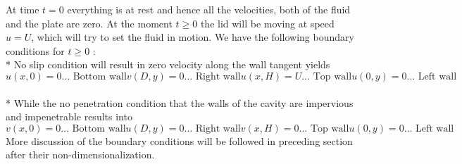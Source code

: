 \documentclass{article}
\begin{document}
At time $t=0$ everything is at rest and hence all the velocities, both of the fluid and the plate are zero. At the moment $t \geq0$ the lid will be moving at speed $u=U$, which will try to set the fluid in motion. We have the following boundary conditions for $t\geq0$ :
\\*
No slip condition will result in zero velocity along the wall tangent yields
\begin{subequations}
\begin{equation}
u(x,0)=0  \dots \text{ Bottom wall}
\end{equation}
\begin{equation}
v(D,y)=0 \dots \text{ Right wall}
\end{equation}
\begin{equation}
u(x,H)=U \dots \text{ Top wall}
\end{equation}
\begin{equation}
u(0,y)=0 \dots \text{ Left wall}
\end{equation}
\end{subequations}
\\*
While the no penetration condition that the walls of the cavity are impervious and impenetrable results into
\begin{subequations}
\begin{equation} 
v(x,0)=0 \dots \text{ Bottom wall}
\end{equation}
\begin{equation}
u(D,y)=0 \dots \text{ Right wall}
\end{equation}
\begin{equation}
v(x,H)=0 \dots \text{ Top wall}
\end{equation}
\begin{equation}
u(0,y)=0 \dots \text{ Left wall}
\end{equation}
\end{subequations}
More discussion of the boundary conditions will be followed in preceding section after their non-dimensionalization.
\end{document}

